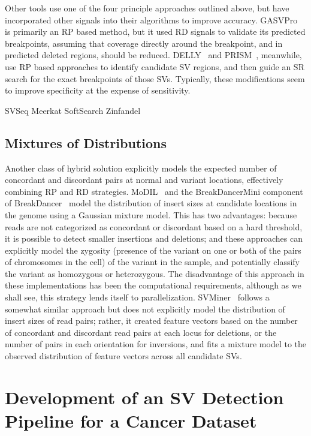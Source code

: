 Other tools use one of the four principle approaches outlined above, but have incorporated other signals into their algorithms to improve accuracy. GASVPro~\cite{Sindi:2012kk} is primarily an RP based method, but it used RD signals to validate its predicted breakpoints, assuming that coverage directly around the breakpoint, and in predicted deleted regions, should be reduced. DELLY~\cite{Rausch:2012he} and PRISM~\cite{Jiang:2012cp}, meanwhile, use RP based approaches to identify candidate SV regions, and then guide an SR search for the exact breakpoints of those SVs. Typically, these modifications seem to improve specificity at the expense of sensitivity.

SVSeq
Meerkat
SoftSearch
Zinfandel

\subsection{Mixtures of Distributions}\label{section_mixture_of_distributions}

Another class of hybrid solution explicitly models the expected number of concordant and discordant pairs at normal and variant locations, effectively combining RP and RD strategies. MoDIL~\cite{Lee:2009da} and the BreakDancerMini component of BreakDancer~\cite{Chen:2009p3} model the distribution of insert sizes at candidate locations in the genome using a Gaussian mixture model. This has two advantages: because reads are not categorized as concordant or discordant based on a hard threshold, it is possible to detect smaller insertions and deletions; and these approaches can explicitly model the zygosity (presence of the variant on one or both of the pairs of chromosomes in the cell) of the variant in the sample, and potentially classify the variant as homozygous or heterozygous. The disadvantage of this approach in these implementations has been the computational requirements, although as we shall see, this strategy lends itself to parallelization. SVMiner~\cite{Hayes:2012ia} follows a somewhat similar approach but does not explicitly model the distribution of insert sizes of read pairs; rather, it created feature vectors based on the number of concordant and discordant read pairs at each locus for deletions, or the number of pairs in each orientation for inversions, and fits a mixture model to the observed distribution of feature vectors across all candidate SVs.

\section{Development of an SV Detection Pipeline for a Cancer Dataset}\label{section_aml_pipeline}

